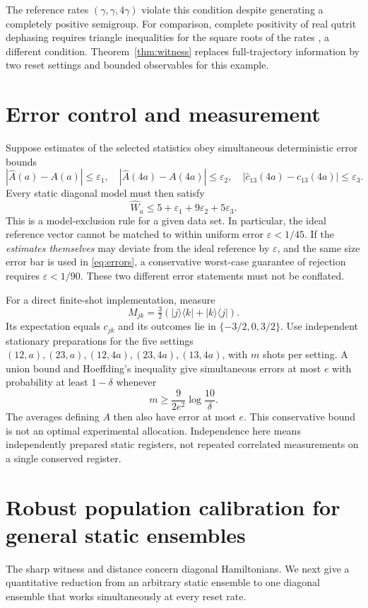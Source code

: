 \documentclass[11pt,a4paper]{article}
\begin{document}
The reference rates $(\gamma,\gamma,4\gamma)$ violate this
condition despite generating a completely positive semigroup.
For comparison, complete positivity of real qutrit dephasing requires
triangle inequalities for the square roots of the rates
\cite{schirmer}, a different condition.
Theorem~\ref{thm:witness} replaces full-trajectory information by
two reset settings and bounded observables for this example.

\section{Error control and measurement}
Suppose estimates of the selected statistics obey simultaneous
deterministic error bounds
\[
 |\widehat A(a)-A(a)|\leq\varepsilon_1,\quad
 |\widehat A(4a)-A(4a)|\leq\varepsilon_2,\quad
 |\widehat c_{13}(4a)-c_{13}(4a)|\leq\varepsilon_3.
\]
Every static diagonal model must then satisfy
\begin{equation}\label{eq:errors}
 \widehat W_a\leq5+\varepsilon_1+9\varepsilon_2+5\varepsilon_3.
\end{equation}
This is a model-exclusion rule for a given data set. In particular,
the ideal reference vector cannot be matched to within uniform
error $\varepsilon<1/45$. If the \emph{estimates themselves} may
deviate from the ideal reference by $\varepsilon$, and the same
size error bar is used in \eqref{eq:errors}, a conservative
worst-case guarantee of rejection requires $\varepsilon<1/90$.
These two different error statements must not be conflated.

For a direct finite-shot implementation, measure
\[
 M_{jk}=\tfrac32(|j\rangle\langle k|+|k\rangle\langle j|).
\]
Its expectation equals $c_{jk}$ and its outcomes lie in
$\{-3/2,0,3/2\}$. Use independent stationary preparations for the
five settings $(12,a),(23,a),(12,4a),(23,4a),(13,4a)$, with $m$
shots per setting. A union bound and Hoeffding's inequality give
simultaneous errors at most $e$ with probability at least $1-\delta$
whenever
\begin{equation}\label{eq:shots}
 m\geq\frac{9}{2e^2}\log\frac{10}{\delta}.
\end{equation}
The averages defining $A$ then also have error at most $e$.
This conservative bound is not an optimal experimental allocation.
Independence here means independently prepared static registers, not
repeated correlated measurements on a single conserved register.

\section{Robust population calibration for general static ensembles}
The sharp witness and distance concern diagonal Hamiltonians. We
next give a quantitative reduction from an arbitrary static ensemble
to one diagonal ensemble that works simultaneously at every reset rate.
\end{document}
